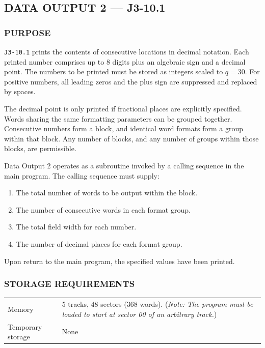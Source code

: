 \subsection*{DATA OUTPUT 2 --- J3-10.1}
\label{sec:data-output-2}

\subsubsection*{PURPOSE}
\texttt{J3-10.1} prints the contents of consecutive locations in decimal notation. Each printed number comprises up to 8 digits plus an algebraic sign and a decimal point. The numbers to be printed must be stored as integers scaled to $q=30$. For positive numbers, all leading zeros and the plus sign are suppressed and replaced by spaces.

The decimal point is only printed if fractional places are explicitly specified. Words sharing the same formatting parameters can be grouped together. Consecutive numbers form a block, and identical word formats form a group within that block. Any number of blocks, and any number of groups within those blocks, are permissible. 

Data Output 2 operates as a subroutine invoked by a calling sequence in the main program. The calling sequence must supply:
\begin{enumerate}
    \item The total number of words to be output within the block.
    \item The number of consecutive words in each format group.
    \item The total field width for each number.
    \item The number of decimal places for each format group.
\end{enumerate}
Upon return to the main program, the specified values have been printed.

\subsubsection*{STORAGE REQUIREMENTS}
\begin{center}
\begin{tabularx}{\textwidth}{lX}
    \toprule
    Memory & 5 tracks, 48 sectors (368 words). \small(\textit{Note: The program must be loaded to start at sector 00 of an arbitrary track.}) \\
    Temporary storage    & None \\
    \bottomrule
\end{tabularx}
\end{center}

